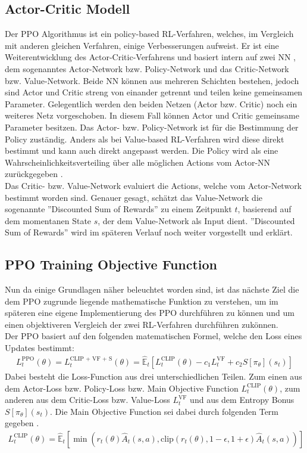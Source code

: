 \subsection{Actor-Critic Modell}
Der PPO Algorithmus ist ein policy-based RL-Verfahren, welches, im Vergleich mit anderen gleichen Verfahren, einige Verbesserungen aufweist. Er ist eine Weiterentwicklung des Actor-Critic-Verfahrens und basiert intern auf zwei NN \cite{DRL}, dem sogenanntes Actor-Network bzw. Policy-Network und das Critic-Network bzw. Value-Network. Beide NN können aus mehreren Schichten bestehen, jedoch sind Actor und Critic streng von einander getrennt und teilen keine gemeinsamen Parameter. Gelegentlich werden den beiden Netzen (Actor bzw. Critic) noch ein weiteres Netz vorgeschoben. In diesem Fall können Actor und Critic gemeinsame Parameter besitzen.
Das Actor- bzw. Policy-Network ist für die Bestimmung der Policy zuständig. Anders als bei Value-based RL-Verfahren wird diese direkt bestimmt und kann auch direkt angepasst werden. Die Policy wird als eine Wahrscheinlichkeitsverteiling über alle möglichen Actions vom Actor-NN zurückgegeben \cite{DRL}.\\
Das Critic- bzw. Value-Network evaluiert die Actions, welche vom Actor-Network bestimmt worden sind. Genauer gesagt, schätzt das Value-Network die sogenannte ''Discounted Sum of Rewards'' zu einem Zeitpunkt $t$, basierend auf dem momentanen State $s$, der dem Value-Network als Input dient. ''Discounted Sum of Rewards'' wird im späteren Verlauf noch weiter vorgestellt und erklärt.

\subsection{PPO Training Objective Function}
Nun da einige Grundlagen näher beleuchtet worden sind, ist das nächste Ziel die dem PPO zugrunde liegende mathematische Funktion zu verstehen, um im späteren eine eigene Implementierung des PPO durchführen zu können und um einen objektiveren Vergleich der zwei RL-Verfahren durchführen zukönnen.
\\Der PPO basiert auf den folgenden matematischen Formel, welche den Loss eines Updates bestimmt:
\begin{align}
	\label{PPO_Training_Loss}
	L^\text{PPO}_{t} (\theta) = L^\text{CLIP + VF + S}_{t} (\theta) = \mathbb{\hat{E}}_{t} [L^{\text{CLIP}}_{t}(\theta) - c_{1}L^{\text{VF}}_{t} + c_{2}S[\pi_{\theta}](s_{t})]
\end{align}
Dabei besteht die Loss-Function aus drei unterschiedlichen Teilen. Zum einen aus dem Actor-Loss bzw. Policy-Loss bzw. Main Objective Function $L^{\text{CLIP}}_{t}(\theta)$, zum anderen aus dem Critic-Loss bzw. Value-Loss $L^{\text{VF}}_{t}$ und aus dem Entropy Bonus $S[\pi_{\theta}](s_{t})$. Die Main Objective Function sei dabei durch folgenden Term gegeben \cite{PPO}.
\begin{align}
	L^\text{CLIP}_{t} (\theta) = \mathbb{\hat{E}}_{t} [ \min(r_{t}(\theta) \hat{A}_{t}(s, a), \text{clip}(r_{t}(\theta), 1 - \epsilon, 1 + \epsilon) \hat{A}_{t}(s, a))]
\end{align}


